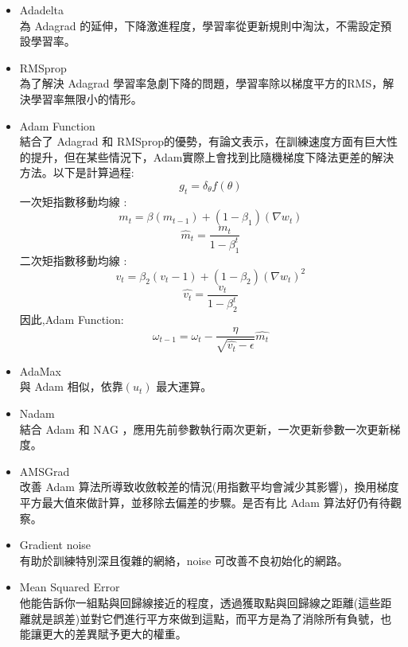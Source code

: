\documentclass[14pt,a4paper]{report}  %
\begin{document}
\begin{itemize}
\item Adadelta\\
為 Adagrad 的延伸，下降激進程度，學習率從更新規則中淘汰，不需設定預設學習率。
\item RMSprop\\
為了解決 Adagrad 學習率急劇下降的問題，學習率除以梯度平方的RMS，解決學習率無限小的情形。
\item Adam Function\\
結合了 Adagrad 和 RMSprop的優勢，有論文表示，在訓練速度方面有巨大性的提升，但在某些情況下，Adam實際上會找到比隨機梯度下降法更差的解決方法。以下是計算過程:\\
$$g_t=\delta_{\theta}f(\theta)$$
一次矩指數移動均線 :\\
$$m_t =\beta(m_{t-1})+(1-\beta_1)(\nabla{w_t})$$
$$\hat m_t=\frac{m_t}{1-\beta_1^t}$$
二次矩指數移動均線 :\\
$$v_t=\beta_2(v_t-1)+(1-\beta_2)(\nabla{w_t})^2$$
$$\hat{v_t}=\frac{v_t}{1-\beta_2^t}$$
因此,Adam Function:\\
$$\omega_{t-1}=\omega_t-\frac{\eta}{\sqrt{\hat{v_t}-\epsilon}}\hat{m_t}$$
\item AdaMax\\
與 Adam 相似，依靠$(u_t)$ 最大運算。
\item Nadam\\
結合 Adam 和 NAG ，應用先前參數執行兩次更新，一次更新參數一次更新梯度。
\item AMSGrad\\
改善 Adam 算法所導致收斂較差的情況(用指數平均會減少其影響)，換用梯度平方最大值來做計算，並移除去偏差的步驟。是否有比 Adam 算法好仍有待觀察。
\item Gradient noise\\[6pt]
有助於訓練特別深且復雜的網絡，noise 可改善不良初始化的網路。
\item Mean Squared Error\\
他能告訴你一組點與回歸線接近的程度，透過獲取點與回歸線之距離(這些距離就是誤差)並對它們進行平方來做到這點，而平方是為了消除所有負號，也能讓更大的差異賦予更大的權重。\\
\vspace{8cm}
\begin{figure}
\begin{center}

\end{center}
\end{figure}
\end{itemize}
\end{document}

